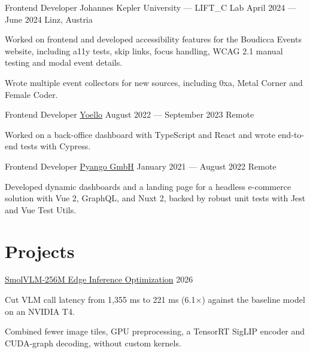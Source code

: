 \documentclass[letterpaper]{resume_config}
\begin{document}
\WorkExperience
    {Frontend Developer} %
    {Johannes Kepler University --- LIFT\_C Lab} %
    {April 2024 --- June 2024} %
    {Linz, Austria} %
    {
        \item Worked on frontend and developed accessibility features for the Boudicca Events website, including a11y tests, skip links, focus handling, WCAG 2.1 manual testing and modal event details.
        \item Wrote multiple event collectors for new sources, including 0xa, Metal Corner and Female Coder.
    }

\WorkExperience
    {Frontend Developer} %
    {\href{https://www.yoello.com/}{Yoello}} %
    {August 2022 --- September 2023} %
    {Remote} %
    {
        \item Worked on a back-office dashboard with TypeScript and React and wrote end-to-end tests with Cypress.
    }

\WorkExperience
    {Frontend Developer} %
    {\href{https://pyango.agency/}{Pyango GmbH}} %
    {January 2021 --- August 2022} %
    {Remote} %
    {
        \item Developed dynamic dashboards and a landing page for a headless e-commerce solution with Vue 2, GraphQL, and Nuxt 2, backed by robust unit tests with Jest and Vue Test Utils.
    }
\vspace{-6pt}

\section{Projects}

\ProjectEntry
    {\href{https://github.com/mahdikhashan/edge-ai-smol-vlm-256-optimization}{SmolVLM-256M Edge Inference Optimization}}
    {2026}
    {
        \item Cut VLM call latency from 1,355 ms to 221 ms (6.1$\times$) against the baseline model on an NVIDIA T4.
        \item Combined fewer image tiles, GPU preprocessing, a TensorRT SigLIP encoder and CUDA-graph decoding, without custom kernels.
    }
\end{document}
